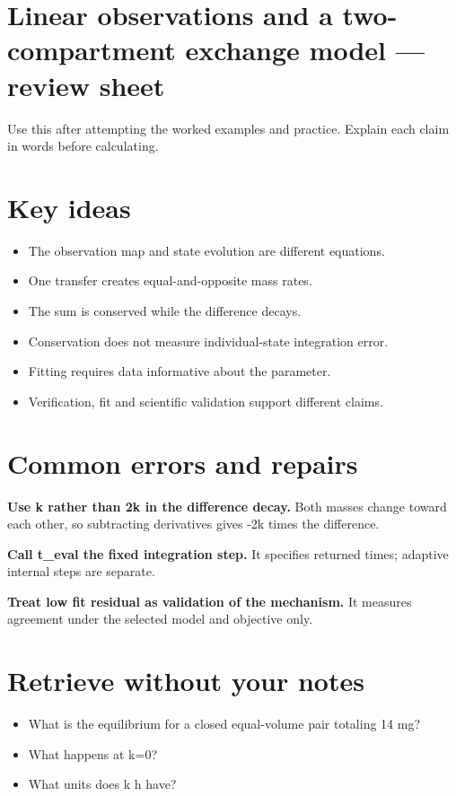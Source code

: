 \documentclass[11pt,letterpaper]{article}
\theoremstyle{definition}\newtheorem{definition}{Definition}\newtheorem{example}{Example}
\numberwithin{equation}{section}
\begin{document}
\setlength{\parskip}{4pt}
\section*{Linear observations and a two-compartment exchange model --- review sheet}
Use this after attempting the worked examples and practice. Explain each claim in words before calculating.

\section*{Key ideas}
\begin{itemize}
\item The observation map and state evolution are different equations.
\item One transfer creates equal-and-opposite mass rates.
\item The sum is conserved while the difference decays.
\item Conservation does not measure individual-state integration error.
\item Fitting requires data informative about the parameter.
\item Verification, fit and scientific validation support different claims.
\end{itemize}
\section*{Common errors and repairs}
\textbf{Use k rather than 2k in the difference decay.} Both masses change toward each other, so subtracting derivatives gives -2k times the difference.

\textbf{Call t\_eval the fixed integration step.} It specifies returned times; adaptive internal steps are separate.

\textbf{Treat low fit residual as validation of the mechanism.} It measures agreement under the selected model and objective only.

\section*{Retrieve without your notes}
\begin{itemize}
\item What is the equilibrium for a closed equal-volume pair totaling 14 mg?
\item What happens at k=\allowbreak{}0?
\item What units does k h have?
\end{itemize}
\end{document}
